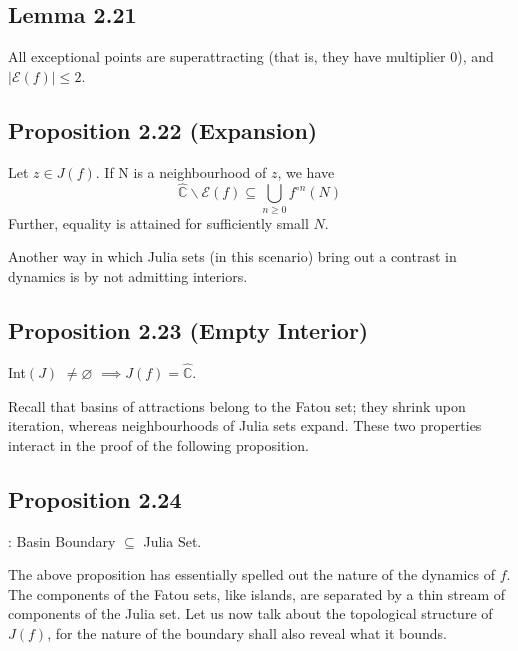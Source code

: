 \documentclass[11pt,a4paper]{article}
\begin{document}


        \subsection*{Lemma 2.21} All exceptional points are superattracting (that is, they have multiplier 0), and $|\mathcal{E}(f)| \leq 2$.



        \subsection*{Proposition 2.22 (Expansion)} Let $z \in J(f)$. If N is a neighbourhood of $z$, we have $$\hat{\mathbb{C}}\backslash \mathcal{E}(f) \subseteq \bigcup_{n\geq0}{f^{\circ n}(N)}$$ Further, equality is attained for sufficiently small $N$.



         Another way in which Julia sets (in this scenario) bring out a contrast in dynamics is by not admitting interiors.

        \subsection*{Proposition 2.23 (Empty Interior)}  Int$(J)$ $\neq \varnothing$ $\implies J(f) = \hat{\mathbb{C}}$.



        Recall that basins of attractions belong to the Fatou set; they shrink upon iteration, whereas neighbourhoods of Julia sets expand. These two properties interact in the proof of the following proposition.

        \subsection*{Proposition 2.24}:  Basin Boundary $\subseteq$ Julia Set.



        The above proposition has essentially spelled out the nature of the dynamics of $f$. The components of the Fatou sets, like islands, are separated by a thin stream of components of the Julia set. Let us now talk about the topological structure of $J(f)$, for the nature of the boundary shall also reveal what it bounds.
\end{document}
